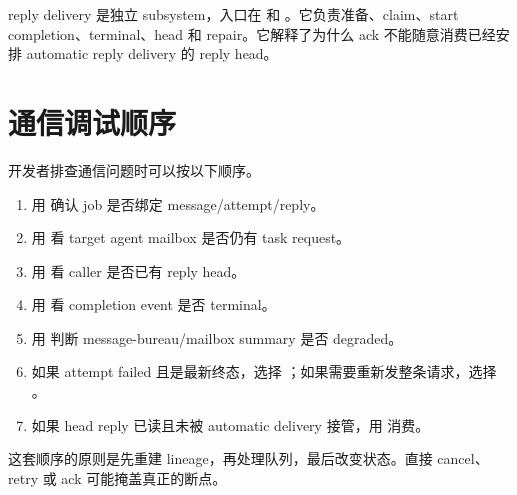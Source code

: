 reply delivery 是独立 subsystem，入口在  和 。它负责准备、claim、start completion、terminal、head 和 repair。它解释了为什么 ack 不能随意消费已经安排 automatic reply delivery 的 reply head。

\section{通信调试顺序}

开发者排查通信问题时可以按以下顺序。

\begin{enumerate}
  \item 用  确认 job 是否绑定 message/attempt/reply。
  \item 用  看 target agent mailbox 是否仍有 task request。
  \item 用  看 caller 是否已有 reply head。
  \item 用  看 completion event 是否 terminal。
  \item 用  判断 message-bureau/mailbox summary 是否 degraded。
  \item 如果 attempt failed 且是最新终态，选择 ；如果需要重新发整条请求，选择 。
  \item 如果 head reply 已读且未被 automatic delivery 接管，用  消费。
\end{enumerate}

这套顺序的原则是先重建 lineage，再处理队列，最后改变状态。直接 cancel、retry 或 ack 可能掩盖真正的断点。
